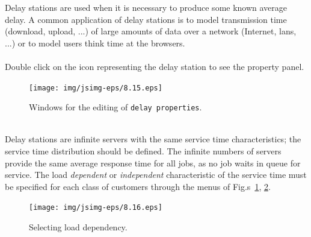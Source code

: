 Delay stations are used when it is necessary to produce some known
average delay. A common application of delay stations is to model
transmission time (download, upload, ...) of large amounts of data
over a network (Internet, lans, ...) or to model users think time
at the browsers.\\

\\ Double
click on the icon representing the delay station to see the
property panel.\\
\begin{figure}[htb]
    \begin{center}
        \texttt{[image: img/jsimg-eps/8.15.eps]}
    \end{center}
    \caption{Windows for the editing of \texttt{delay properties}.}
    \label{fig:editdprop}
\end{figure}

\\ Delay stations are infinite
servers with the same service time characteristics; the service
time distribution should be defined. The infinite numbers of
servers provide the same  average response time for all jobs, as
no job waits in queue for service. The load \emph{dependent} or
\emph{independent} characteristic of the service time must be
specified for each class of customers through the menus of
Fig.s~\ref{fig:editdprop}, \ref{fig:selloaddep}.
\begin{figure}[htb]
    \begin{center}
        \texttt{[image: img/jsimg-eps/8.16.eps]}
    \end{center}
    \caption{Selecting load dependency.}
    \label{fig:selloaddep}
\end{figure}

